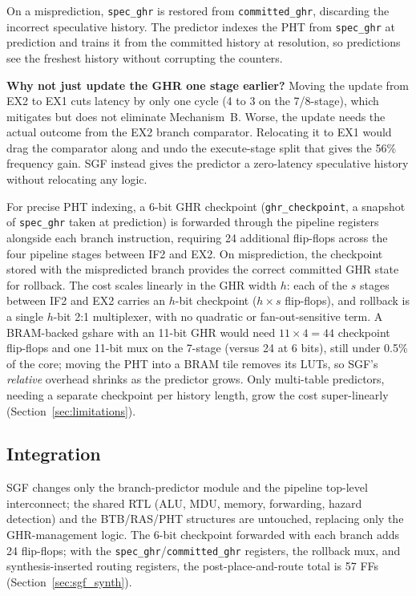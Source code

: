 \documentclass[acmsmall,nonacm,screen]{acmart}
\begin{document}
On a misprediction, \texttt{spec\_ghr} is restored from \texttt{committed\_ghr}, discarding the incorrect speculative history. The predictor indexes the PHT from \texttt{spec\_ghr} at prediction and trains it from the committed history at resolution, so predictions see the freshest history without corrupting the counters.

\textbf{Why not just update the GHR one stage earlier?}
Moving the update from EX2 to EX1 cuts latency by only one cycle (4 to 3 on the 7/8-stage), which mitigates but does not eliminate Mechanism~B. Worse, the update needs the actual outcome from the EX2 branch comparator. Relocating it to EX1 would drag the comparator along and undo the execute-stage split that gives the 56\% frequency gain.
SGF instead gives the predictor a zero-latency speculative history without relocating any logic.

For precise PHT indexing, a 6-bit GHR checkpoint (\texttt{ghr\_checkpoint}, a snapshot of \texttt{spec\_ghr} taken at prediction) is forwarded through the pipeline registers alongside each branch instruction, requiring 24 additional flip-flops across the four pipeline stages between IF2 and EX2.
On misprediction, the checkpoint stored with the mispredicted branch provides the correct committed GHR state for rollback.
The cost scales linearly in the GHR width $h$: each of the $s$ stages between IF2 and EX2 carries an $h$-bit checkpoint ($h\!\times\!s$ flip-flops), and rollback is a single $h$-bit 2:1 multiplexer, with no quadratic or fan-out-sensitive term. A BRAM-backed gshare with an 11-bit GHR would need $11\!\times\!4=44$ checkpoint flip-flops and one 11-bit mux on the 7-stage (versus 24 at 6 bits), still under 0.5\% of the core; moving the PHT into a BRAM tile removes its LUTs, so SGF's \emph{relative} overhead shrinks as the predictor grows. Only multi-table predictors, needing a separate checkpoint per history length, grow the cost super-linearly (Section~\ref{sec:limitations}).

\subsection{Integration}
\label{sec:sgf_integration}

SGF changes only the branch-predictor module and the pipeline top-level interconnect; the shared RTL (ALU, MDU, memory, forwarding, hazard detection) and the BTB/RAS/PHT structures are untouched, replacing only the GHR-management logic. The 6-bit checkpoint forwarded with each branch adds 24 flip-flops; with the \texttt{spec\_ghr}/\texttt{committed\_ghr} registers, the rollback mux, and synthesis-inserted routing registers, the post-place-and-route total is 57 FFs (Section~\ref{sec:sgf_synth}).
\end{document}
